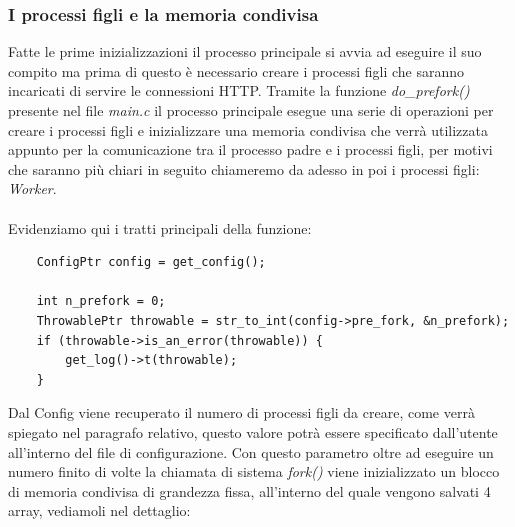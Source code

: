 \documentclass[italian]{tktltiki2}
\begin{document}
\subsubsection{I processi figli e la memoria condivisa}
\label{ssec:child_process}
Fatte le prime inizializzazioni il processo principale si avvia ad eseguire il suo compito ma prima di questo è necessario creare i processi figli che saranno incaricati di servire le connessioni HTTP. Tramite la funzione \emph{do\_prefork()} presente nel file \emph{main.c} il processo principale esegue una serie di operazioni per creare i processi figli e inizializzare una memoria condivisa che verrà utilizzata appunto per la comunicazione tra il processo padre e i processi figli, per motivi che saranno più chiari in seguito chiameremo da adesso in poi i processi figli: \emph{Worker}. \\\\Evidenziamo qui i tratti principali della funzione:

\begin{lstlisting}
    ConfigPtr config = get_config();
    
    int n_prefork = 0;
    ThrowablePtr throwable = str_to_int(config->pre_fork, &n_prefork);
    if (throwable->is_an_error(throwable)) {
        get_log()->t(throwable);
    }
\end{lstlisting}
Dal Config viene recuperato il numero di processi figli da creare, come verrà spiegato nel paragrafo relativo, questo valore potrà essere specificato dall'utente all'interno del file di configurazione. Con questo parametro oltre ad eseguire un numero finito di volte la chiamata di sistema \emph{fork()} viene inizializzato un blocco di memoria condivisa di grandezza fissa, all'interno del quale vengono salvati 4 array, vediamoli nel dettaglio:
\end{document}

